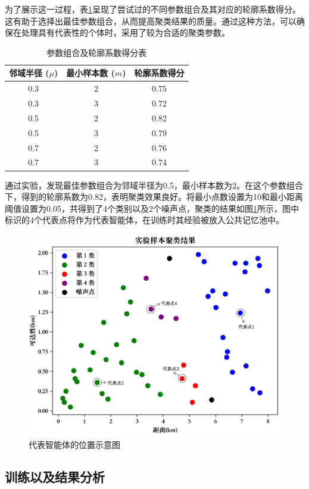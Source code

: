为了展示这一过程，表\ref{tab_cluster}呈现了尝试过的不同参数组合及其对应的轮廓系数得分。这有助于选择出最佳参数组合，从而提高聚类结果的质量。通过这种方法，可以确保在处理具有代表性的个体时，采用了较为合适的聚类参数。

\renewcommand{\arraystretch}{1.2} %
\setlength{\tabcolsep}{8mm}
\begin{table}[htbp]
\centering
\caption{参数组合及轮廓系数得分表}
\label{tab_cluster}
\begin{tabular}{ccc}
\toprule
邻域半径 ($\mu$) & 最小样本数 ($m$) & 轮廓系数得分       \\
\midrule
0.3 & 2 & 0.75 \\ 
0.3 & 3 & 0.72 \\ 
0.5 & 2 & 0.82 \\ 
0.5 & 3 & 0.79 \\ 
0.7 & 2 & 0.76 \\ 
0.7 & 3 & 0.74 \\ 

\bottomrule
\end{tabular}
\end{table}

通过实验，发现最佳参数组合为邻域半径为0.5，最小样本数为2。在这个参数组合下，得到的轮廓系数为0.82，表明聚类效果良好。将最小点数设置为10和最小距离阈值设置为0.05，共得到了4个类别以及2个噪声点，聚类的结果如图\ref{db_cluster}所示，图中标识的4个代表点将作为代表智能体，在训练时其经验被放入公共记忆池中。
\begin{figure}[H]
  \centering
  \includegraphics[width=.75\linewidth]{figures/content/db_cluster.png}
  \caption{代表智能体的位置示意图}
  \label{db_cluster}
\end{figure}


\subsection{训练以及结果分析}

